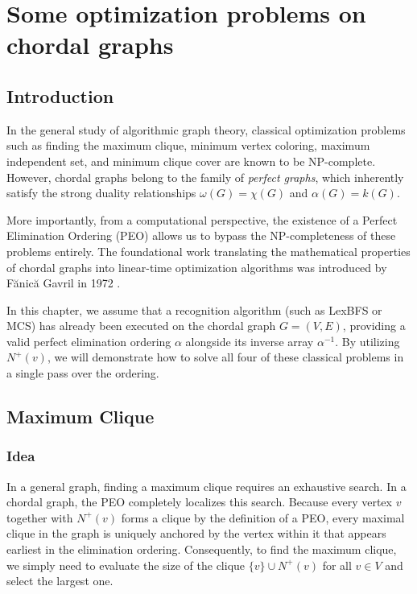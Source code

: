 \chapter{Some optimization problems on chordal graphs}

\section{Introduction}

In the general study of algorithmic graph theory, classical optimization problems such as finding the maximum clique, minimum vertex coloring, maximum independent set, and minimum clique cover are known to be NP-complete. However, chordal graphs belong to the family of \textit{perfect graphs}, which inherently satisfy the strong duality relationships $\omega(G) = \chi(G)$ and $\alpha(G) = k(G)$. \cite{Berge1961}

More importantly, from a computational perspective, the existence of a Perfect Elimination Ordering (PEO) allows us to bypass the NP-completeness of these problems entirely. The foundational work translating the mathematical properties of chordal graphs into linear-time optimization algorithms was introduced by Fănică Gavril in 1972 \cite{Gavril1972}.

In this chapter, we assume that a recognition algorithm (such as LexBFS or MCS) has already been executed on the chordal graph $G=(V, E)$, providing a valid perfect elimination ordering $\alpha$ alongside its inverse array $\alpha^{-1}$. By utilizing $N^+(v)$, we will demonstrate how to solve all four of these classical problems in a single pass over the ordering.


\section{Maximum Clique}

\subsection{Idea}
In a general graph, finding a maximum clique requires an exhaustive search. In a chordal graph, the PEO completely localizes this search. Because every vertex $v$ together with $N^+(v)$ forms a clique by the definition of a PEO, every maximal clique in the graph is uniquely anchored by the vertex within it that appears earliest in the elimination ordering. Consequently, to find the maximum clique, we simply need to evaluate the size of the clique $\{v\} \cup N^+(v)$ for all $v \in V$ and select the largest one.


